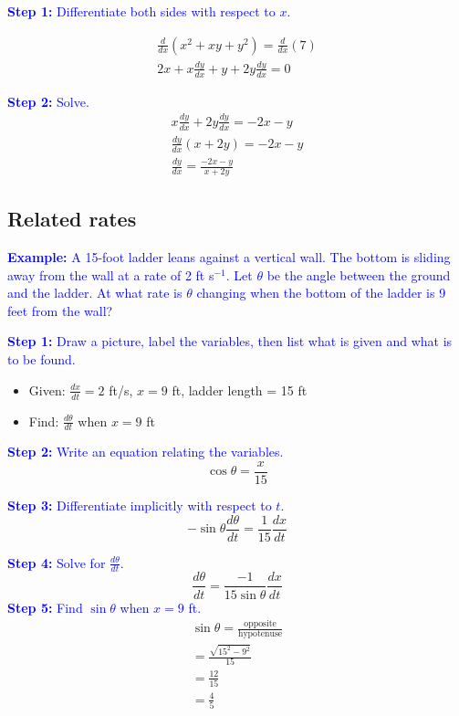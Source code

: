 \documentclass[letterpaper, 12pt]{article}
\newcommand{\example}[1]{\textcolor{blue}{\textbf{Example:} #1}}
\newcommand{\step}[2]{\textcolor{blue}{\textbf{Step #1:} #2}}
\begin{document}
\step{1}{Differentiate both sides with respect to $x$.}

\begin{gather*}
\frac{d}{dx} (x^2+xy+y^2) = \frac{d}{dx} (7) \\
2x + x \frac{dy}{dx} + y + 2y \frac{dy}{dx} = 0
\end{gather*}

\step{2}{Solve.}
\begin{gather*}
x \frac{dy}{dx} + 2y \frac{dy}{dx} = -2x - y \\
\frac{dy}{dx} (x + 2y) = -2x - y \\
\boxed{\frac{dy}{dx} = \frac{-2x - y}{x + 2y}}
\end{gather*}

\subsection*{Related rates}

\example{A 15-foot ladder leans against a vertical wall. The bottom is sliding away from the wall at a rate of 2 ft s$^{-1}$. Let $\theta$ be the angle between the ground and the ladder. At what rate is $\theta$ changing when the bottom of the ladder is 9 feet from the wall?}

\step{1}{Draw a picture, label the variables, then list what is given and what is to be found.}

\begin{itemize}
\item Given: $\frac{dx}{dt} = 2$ ft/s, $x = 9$ ft, ladder length = 15 ft
\item Find: $\frac{d\theta}{dt}$ when $x = 9$ ft
\end{itemize}

\step{2}{Write an equation relating the variables.}
\[\cos \theta = \frac{x}{15}\]

\step{3}{Differentiate implicitly with respect to $t$.}
\[-\sin \theta \frac{d\theta}{dt} = \frac{1}{15} \frac{dx}{dt}\]

\step{4}{Solve for $\frac{d\theta}{dt}$.}
\[\frac{d\theta}{dt} = \frac{-1}{15 \sin \theta} \frac{dx}{dt}\]
\step{5}{Find $\sin \theta$ when $x = 9$ ft.}
\begin{gather*}
\sin \theta = \frac{\text{opposite}}{\text{hypotenuse}} \\ = \frac{\sqrt{15^2 - 9^2}}{15} \\ = \frac{12}{15} \\ = \boxed{\frac{4}{5}}
\end{gather*}
\end{document}
